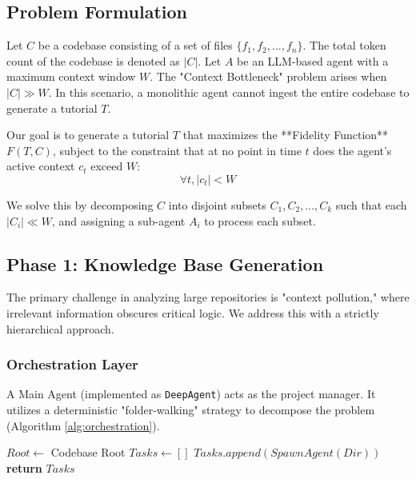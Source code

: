\documentclass[conference]{IEEEtran}
\begin{document}
\subsection{Problem Formulation}
Let $C$ be a codebase consisting of a set of files $\{f_1, f_2, ..., f_n\}$. The total token count of the codebase is denoted as $|C|$. Let $A$ be an LLM-based agent with a maximum context window $W$.
The "Context Bottleneck" problem arises when $|C| \gg W$. In this scenario, a monolithic agent cannot ingest the entire codebase to generate a tutorial $T$.

Our goal is to generate a tutorial $T$ that maximizes the **Fidelity Function** $F(T, C)$, subject to the constraint that at no point in time $t$ does the agent's active context $c_t$ exceed $W$:
$$ \forall t, |c_t| < W $$

We solve this by decomposing $C$ into disjoint subsets $C_1, C_2, ..., C_k$ such that each $|C_i| \ll W$, and assigning a sub-agent $A_i$ to process each subset.

\subsection{Phase 1: Knowledge Base Generation}
The primary challenge in analyzing large repositories is "context pollution," where irrelevant information obscures critical logic. We address this with a strictly hierarchical approach.

\subsubsection{Orchestration Layer}
A Main Agent (implemented as \texttt{DeepAgent}) acts as the project manager. It utilizes a deterministic "folder-walking" strategy to decompose the problem (Algorithm \ref{alg:orchestration}).

\begin{algorithm}
\caption{Deterministic Decomposition Strategy}
\label{alg:orchestration}
\begin{algorithmic}
\STATE $Root \leftarrow$ Codebase Root
\STATE $Tasks \leftarrow []$
        \STATE $Tasks.append(SpawnAgent(Dir))$
    \ENDIF
\ENDFOR
\STATE \textbf{return} $Tasks$
\end{algorithmic}
\end{algorithm}
\end{document}
